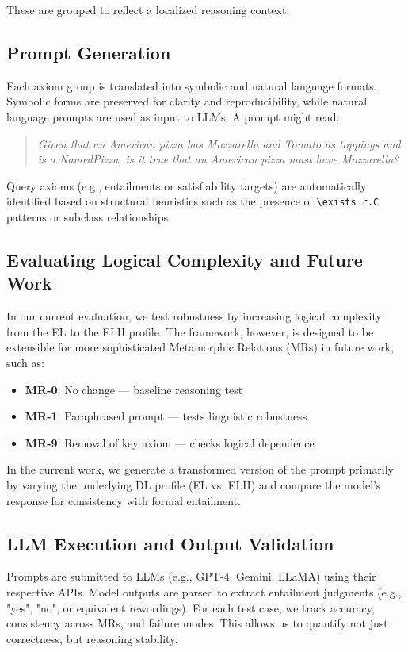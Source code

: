 \documentclass[11pt]{article}
\begin{document}
These are grouped to reflect a localized reasoning context.

\newpage

\subsection{Prompt Generation}
Each axiom group is translated into symbolic and natural language formats. Symbolic forms are preserved for clarity and reproducibility, while natural language prompts are used as input to LLMs. A prompt might read:

\begin{quote}
\textit{Given that an American pizza has Mozzarella and Tomato as toppings and is a NamedPizza, is it true that an American pizza must have Mozzarella?}
\end{quote}

Query axioms (e.g., entailments or satisfiability targets) are automatically identified based on structural heuristics such as the presence of \texttt{\textbackslash exists r.C} patterns or subclass relationships.

\subsection{Evaluating Logical Complexity and Future Work}
In our current evaluation, we test robustness by increasing logical complexity from the EL to the ELH profile. The framework, however, is designed to be extensible for more sophisticated Metamorphic Relations (MRs) in future work, such as:
\begin{itemize}
    \item \textbf{MR-0}: No change — baseline reasoning test
    \item \textbf{MR-1}: Paraphrased prompt — tests linguistic robustness
    \item \textbf{MR-9}: Removal of key axiom — checks logical dependence
\end{itemize}

In the current work, we generate a transformed version of the prompt primarily by varying the underlying DL profile (EL vs. ELH) and compare the model’s response for consistency with formal entailment.

\subsection{LLM Execution and Output Validation}
Prompts are submitted to LLMs (e.g., GPT-4, Gemini, LLaMA) using their respective APIs. Model outputs are parsed to extract entailment judgments (e.g., "yes", "no", or equivalent rewordings). For each test case, we track accuracy, consistency across MRs, and failure modes. This allows us to quantify not just correctness, but reasoning stability.
\end{document}
